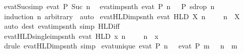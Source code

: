 \begin{isabellebody}
\isamarkupfalse%
\ ev{\isacharunderscore}at{\isacharunderscore}Suc{\isacharbrackleft}simp{\isacharbrackright}{\isacharcolon}\ {\isachardoublequoteopen}ev{\isacharunderscore}at\ P\ {\isacharparenleft}Suc\ n{\isacharparenright}\ {\isasymomega}{\isachardoublequoteclose}\isanewline
\isanewline
{}\isamarkupfalse%
\ ev{\isacharunderscore}at{\isacharunderscore}imp{\isacharunderscore}snth{\isacharcolon}\ {\isachardoublequoteopen}ev{\isacharunderscore}at\ P\ n\ {\isasymomega}\ {\isasymLongrightarrow}\ P\ {\isacharparenleft}sdrop\ n\ {\isasymomega}{\isacharparenright}{\isachardoublequoteclose}\isanewline
%
\isadelimproof
\ \ %
\endisadelimproof
%
\isatagproof
{}\isamarkupfalse%
\ {\isacharparenleft}induction\ n\ arbitrary{\isacharcolon}\ {\isasymomega}{\isacharparenright}\ auto%
\endisatagproof
{\isafoldproof}%
%
\isadelimproof
\isanewline
%
\endisadelimproof
\isanewline
{}\isamarkupfalse%
\ ev{\isacharunderscore}at{\isacharunderscore}HLD{\isacharunderscore}imp{\isacharunderscore}snth{\isacharcolon}\ {\isachardoublequoteopen}ev{\isacharunderscore}at\ {\isacharparenleft}HLD\ X{\isacharparenright}\ n\ {\isasymomega}\ {\isasymLongrightarrow}\ {\isasymomega}\ {\isacharbang}{\isacharbang}\ n\ {\isasymin}\ X{\isachardoublequoteclose}\isanewline
%
\isadelimproof
\ \ %
\endisadelimproof
%
\isatagproof
{}\isamarkupfalse%
\ {\isacharparenleft}auto\ dest{\isacharbang}{\isacharcolon}\ ev{\isacharunderscore}at{\isacharunderscore}imp{\isacharunderscore}snth\ simp{\isacharcolon}\ HLD{\isacharunderscore}iff{\isacharparenright}%
\endisatagproof
{\isafoldproof}%
%
\isadelimproof
\isanewline
%
\endisadelimproof
\isanewline
{}\isamarkupfalse%
\ ev{\isacharunderscore}at{\isacharunderscore}HLD{\isacharunderscore}single{\isacharunderscore}imp{\isacharunderscore}snth{\isacharcolon}\ {\isachardoublequoteopen}ev{\isacharunderscore}at\ {\isacharparenleft}HLD\ {\isacharbraceleft}x{\isacharbraceright}{\isacharparenright}\ n\ {\isasymomega}\ {\isasymLongrightarrow}\ {\isasymomega}\ {\isacharbang}{\isacharbang}\ n\ {\isacharequal}\ x{\isachardoublequoteclose}\isanewline
%
\isadelimproof
\ \ %
\endisadelimproof
%
\isatagproof
{}\isamarkupfalse%
\ {\isacharparenleft}drule\ ev{\isacharunderscore}at{\isacharunderscore}HLD{\isacharunderscore}imp{\isacharunderscore}snth{\isacharparenright}\ simp%
\endisatagproof
{\isafoldproof}%
%
\isadelimproof
\isanewline
%
\endisadelimproof
\isanewline
{}\isamarkupfalse%
\ ev{\isacharunderscore}at{\isacharunderscore}unique{\isacharcolon}\ {\isachardoublequoteopen}ev{\isacharunderscore}at\ P\ n\ {\isasymomega}\ {\isasymLongrightarrow}\ ev{\isacharunderscore}at\ P\ m\ {\isasymomega}\ {\isasymLongrightarrow}\ n\ {\isacharequal}\ m{\isachardoublequoteclose}\isanewline

\end{isabellebody}
